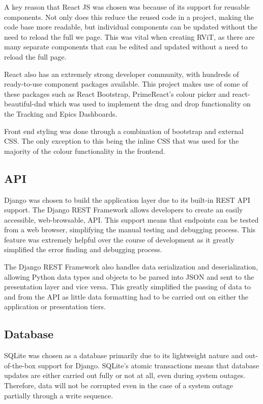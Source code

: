 \documentclass[l4proj.tex]{subfiles}
\begin{document}
A key reason that React JS was chosen was because of its support for reusable components. Not only does this reduce the reused code in a project, making the code base more readable, but individual components can be updated without the need to reload the full we page. This was vital when creating RViT, as there are many separate components that can be edited and updated without a need to reload the full page. 

React also has an extremely strong developer community, with hundreds of ready-to-use component packages available. This project makes use of some of these packages such as React Bootstrap, PrimeReact's colour picker and react-beautiful-dnd which was used to implement the drag and drop functionality on the Tracking and Epics Dashboards.

Front end styling was done through a combination of bootstrap and external CSS. The only exception to this being the inline CSS that was used for the majority of the colour functionality in the frontend.

\subsection{API}
Django was chosen to build the application layer due to its built-in REST API support. The Django REST Framework allows developers to create an easily accessible, web-browsable, API. This support means that endpoints can be tested from a web browser, simplifying the manual testing and debugging process. This feature was extremely helpful over the course of development as it greatly simplified the error finding and debugging process. 

The Django REST Framework also handles data serialization and deserialization, allowing Python data types and objects to be parsed into JSON and sent to the presentation layer and vice versa. This greatly simplified the passing of data to and from the API as little data formatting had to be carried out on either the application or presentation tiers. 


\subsection{Database}
SQLite was chosen as a database primarily due to its lightweight nature and out-of-the-box support for Django. SQLite's atomic transactions means that database updates are either carried out fully or not at all, even during system outages. Therefore, data will not be corrupted even in the case of a system outage partially through a write sequence.
\end{document}
